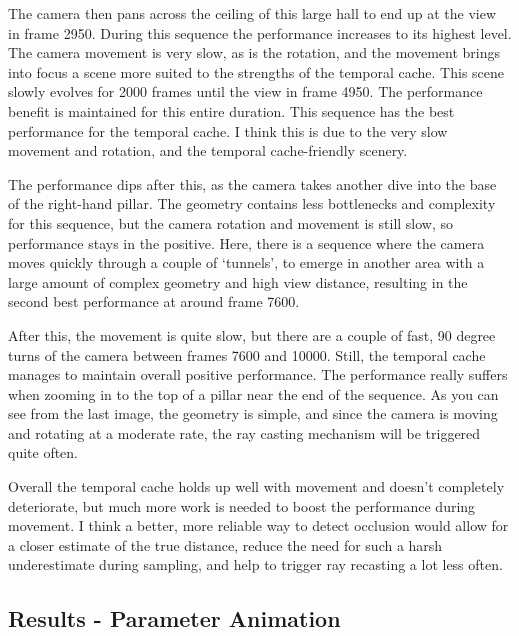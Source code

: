 The camera then pans across the ceiling of this large hall to end up at the view in frame 2950. During this sequence the performance increases to its highest level. The camera movement is very slow, as is the rotation, and the movement brings into focus a scene more suited to the strengths of the temporal cache. This scene slowly evolves for 2000 frames until the view in frame 4950. The performance benefit is maintained for this entire duration. This sequence has the best performance for the temporal cache. I think this is due to the very slow movement and rotation, and the temporal cache-friendly scenery.\newline

The performance dips after this, as the camera takes another dive into the base of the right-hand pillar. The geometry contains less bottlenecks and complexity for this sequence, but the camera rotation and movement is still slow, so performance stays in the positive. Here, there is a sequence where the camera moves quickly through a couple of `tunnels', to emerge in another area with a large amount of complex geometry and high view distance, resulting in the second best performance at around frame 7600.\newline

After this, the movement is quite slow, but there are a couple of fast, 90 degree turns of the camera between frames 7600 and 10000. Still, the temporal cache manages to maintain overall positive performance. The performance really suffers when zooming in to the top of a pillar near the end of the sequence. As you can see from the last image, the geometry is simple, and since the camera is moving and rotating at a moderate rate, the ray casting mechanism will be triggered quite often.\newline

Overall the temporal cache holds up well with movement and doesn't completely deteriorate, but much more work is needed to boost the performance during movement. I think a better, more reliable way to detect occlusion would allow for a closer estimate of the true distance, reduce the need for such a harsh underestimate during sampling, and help to trigger ray recasting a lot less often.

\subsection{Results - Parameter Animation}

